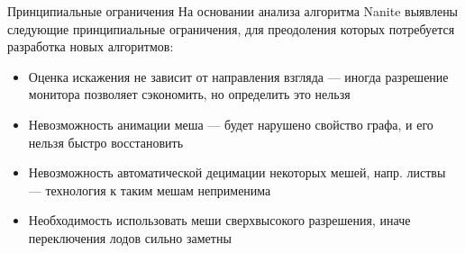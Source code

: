 \begin{frame}{Принципиальные ограничения}
    На основании анализа алгоритма Nanite выявлены следующие принципиальные ограничения, для преодоления которых потребуется разработка новых алгоритмов:
    \begin{itemize}
        \item Оценка искажения не зависит от направления взгляда
        --- иногда разрешение монитора позволяет сэкономить, но определить это нельзя
        \item Невозможность анимации меша --- будет нарушено свойство графа, и его нельзя быстро восстановить
        \item Невозможность автоматической децимации некоторых мешей, напр. листвы --- технология к таким мешам неприменима
        \item Необходимость использовать меши сверхвысокого разрешения, иначе переключения лодов сильно заметны
    \end{itemize}
\end{frame}


